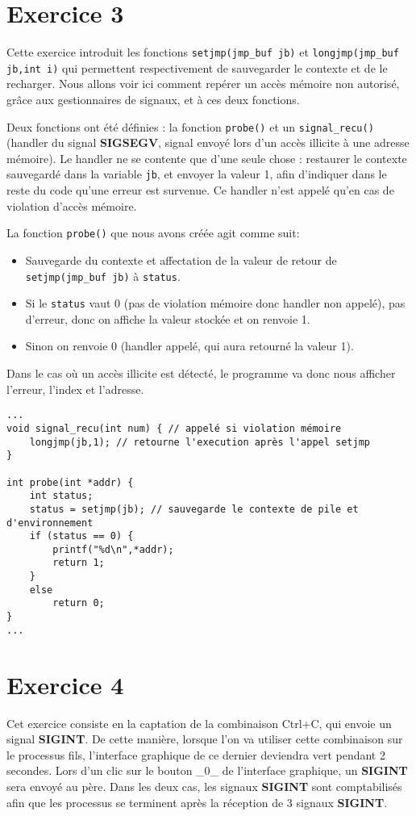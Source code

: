 \section{Exercice 3}
Cette exercice introduit les fonctions \lstinline{setjmp(jmp_buf jb)} et \lstinline{longjmp(jmp_buf jb,int i)} qui permettent respectivement de sauvegarder le contexte et de le recharger. Nous allons voir ici comment repérer un accès mémoire non autorisé, grâce aux gestionnaires de signaux, et à ces deux fonctions.

\medskip

Deux fonctions ont été définies : la fonction \lstinline{probe()} et un \lstinline{signal_recu()} (handler du signal \textbf{SIGSEGV}, signal envoyé lors d'un accès illicite à une adresse mémoire). Le handler ne se contente que d'une seule chose : restaurer le contexte sauvegardé dans la variable \lstinline{jb}, et envoyer la valeur 1, afin d'indiquer dans le reste du code qu'une erreur est survenue. Ce handler n'est appelé qu'en cas de violation d'accès mémoire.

\medskip

La fonction \lstinline{probe()} que nous avons créée agit comme suit:
\begin{itemize}
  \item Sauvegarde du contexte et affectation de la valeur de retour de \lstinline{setjmp(jmp_buf jb)} à \lstinline{status}.
  \item Si le \lstinline{status} vaut 0 (pas de violation mémoire donc handler non appelé), pas d'erreur, donc on affiche la valeur stockée et on renvoie 1.
  \item Sinon on renvoie 0 (handler appelé, qui aura retourné la valeur 1).
\end{itemize}

Dans le cas où un accès illicite est détecté, le programme va donc nous afficher l'erreur, l'index et l'adresse.

\begin{lstlisting}
...
void signal_recu(int num) { // appelé si violation mémoire
    longjmp(jb,1); // retourne l'execution après l'appel setjmp
}

int probe(int *addr) {
    int status;
    status = setjmp(jb); // sauvegarde le contexte de pile et d'environnement
    if (status == 0) {
        printf("%d\n",*addr);
        return 1;
    }
    else
        return 0;
}
...
\end{lstlisting}

\section{Exercice 4}
Cet exercice consiste en la captation de la combinaison Ctrl+C, qui envoie un signal \textbf{SIGINT}. De cette manière, lorsque l'on va utiliser cette combinaison sur le processus fils, l'interface graphique de ce dernier deviendra vert pendant 2 secondes. Lors d'un clic sur le bouton \_0\_ de l'interface graphique, un \textbf{SIGINT} sera envoyé au père. Dans les deux cas, les signaux \textbf{SIGINT} sont comptabilisés afin que les processus se terminent après la réception de 3 signaux \textbf{SIGINT}.

